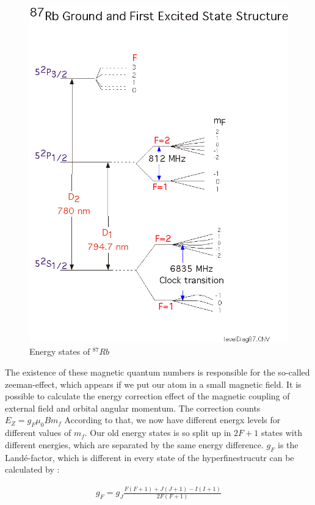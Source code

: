 \begin{figure}[htbp] 
     \includegraphics[scale=0.7]{level87.png}
  \caption{Energy states of $^{87}Rb$ \cite{levels}}
  \label{states}
\end{figure}

The existence of these magnetic quantum numbers is responsible for the so-called zeeman-effect, which appears if we put our atom in a small magnetic field. It is possible to calculate the energy correction effect of the magnetic coupling of external field and orbital angular momentum. The correction counts $E_Z=g_F\mu_0 Bm_f$
According to that, we now have different energx levels for different values of $m_f$. Our old energy states is so split up in $2F+1$ states with different energies, which are separated by the same energy difference. $g_F$ is the Landé-factor, which is different in every state of the hyperfinestrucutr can be calculated by \cite{manual1}:

\begin{align}
g_F=g_J \frac{F\left(F+1\right)+J\left(J+1\right)-I\left(I+1\right)}{2F\left(F+1\right)}
\end{align}

